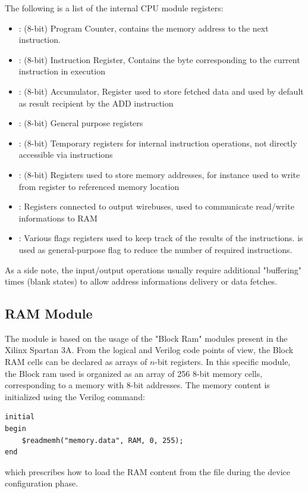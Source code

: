 The following is a list of the internal CPU module registers:
\begin{itemize}
    \item {}: (8-bit) Program Counter, contains the memory address to the next instruction.
    \item {}: (8-bit) Instruction Register, Contains the byte corresponding to the current instruction in execution
    \item {}: (8-bit) Accumulator, Register used to store fetched data and used by default as result recipient by the ADD instruction
    \item {}: (8-bit) General purpose registers
    \item {}: (8-bit) Temporary registers for internal instruction operations, not directly accessible via instructions
    \item {}: (8-bit) Registers used to store memory addresses, for instance used to write from register to referenced memory location
    \item {}: Registers connected to output wirebuses, used to communicate read/write informations to RAM
    \item {}: Various flags registers used to keep track of the results of the instructions.
     is used as general-purpose flag to reduce the number of required instructions.
\end{itemize}

As a side note, the input/output operations usually require additional "buffering" times (blank states) to allow address informations delivery or data fetches.

\subsection{RAM Module}  \label{ssec:ram}
The  module \cite{BRAM} is based on the usage of the "Block Ram" modules present in the Xilinx Spartan 3A.
From the logical and Verilog code points of view, the Block RAM cells can be declared as arrays of $n$-bit registers.
In this specific module, the Block ram used is organized as an array of 256 8-bit memory cells, corresponding to a memory with 8-bit addresses.
The memory content is initialized using the Verilog command:
\begin{verbatim}
initial
begin
	$readmemh("memory.data", RAM, 0, 255);
end
\end{verbatim}
which prescribes how to load the RAM content from the file  during the device configuration phase.

